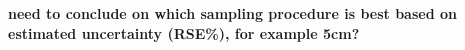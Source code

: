 \documentclass[a4paper 12pt]{article}
\numberwithin{equation}{section}
\begin{document}
{\bf need to conclude on which sampling procedure is best based on estimated uncertainty (RSE\%), for example 5cm?}
 

\end{document}
